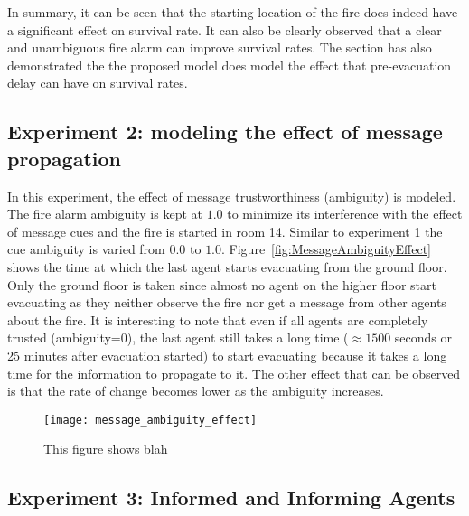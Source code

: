 In summary, it can be seen that the starting location of the fire does indeed have a significant effect on survival rate. It can also be clearly observed that a clear and unambiguous fire alarm can improve survival rates. The section has also demonstrated the the proposed model does model the effect that pre-evacuation delay can have on survival rates.



\subsection{Experiment 2:  modeling the effect of message propagation}
\label{PreEvac:experiment2}

In this experiment, the effect of message trustworthiness (ambiguity) is modeled. The fire alarm ambiguity is kept at $1.0$ to minimize its interference with the effect of message cues and the fire is started in room 14. Similar to experiment 1 the cue ambiguity is varied from $0.0$ to $1.0$. Figure~\ref{fig:MessageAmbiguityEffect} shows the time at which the last agent starts evacuating from the ground floor. Only the ground floor is taken since almost no agent on the higher floor start evacuating as they neither observe the fire nor get a message from other agents about the fire. It is interesting to note that even if all agents are completely trusted (ambiguity=0), the last agent still takes a long time ($\approx 1500$ seconds or 25 minutes after evacuation started) to start evacuating because it takes a long time for the information to propagate to it. The other effect that can be observed is that the rate of change becomes lower as the ambiguity increases.


\begin{figure}[!tb]
	\centering
		\texttt{[image: message\_ambiguity\_effect]}
	\caption{This figure shows blah}
	\label{fig:SurvivalPlotDifferentRooms}
\end{figure}

\subsection{Experiment 3: Informed and Informing Agents} %
\label{sec:experiment_3_informed_and_informing_agents}

